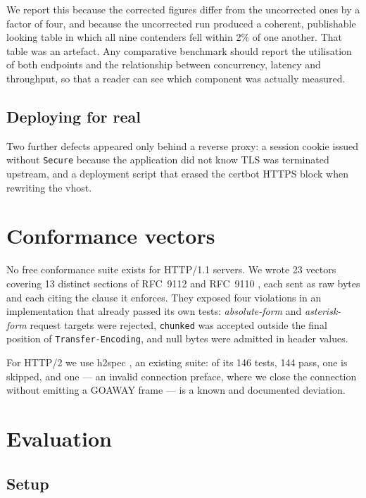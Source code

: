 \documentclass[preprint,12pt]{elsarticle}
\begin{document}
We report this because the corrected figures differ from the uncorrected ones by
a factor of four, and because the uncorrected run produced a coherent, publishable
looking table in which all nine contenders fell within 2\% of one another. That
table was an artefact. Any comparative benchmark should report the utilisation
of both endpoints and the relationship between concurrency, latency and
throughput, so that a reader can see which component was actually measured.

\subsection{Deploying for real}

Two further defects appeared only behind a reverse proxy: a session cookie
issued without \texttt{Secure} because the application did not know TLS was
terminated upstream, and a deployment script that erased the certbot HTTPS block
when rewriting the vhost.

\section{Conformance vectors}
\label{sec:conformance}

No free conformance suite exists for HTTP/1.1 servers. We wrote 23 vectors
covering 13 distinct sections of RFC~9112 \cite{rfc9112} and RFC~9110
\cite{rfc9110}, each sent as raw bytes
and each citing the clause it enforces. They exposed four violations in an
implementation that already passed its own tests: \emph{absolute-form} and
\emph{asterisk-form} request targets were rejected, \texttt{chunked} was
accepted outside the final position of \texttt{Transfer-Encoding}, and null
bytes were admitted in header values.

For HTTP/2 we use h2spec \cite{h2spec}, an existing suite: of its 146 tests, 144 pass, one is
skipped, and one --- an invalid connection preface, where we close the
connection without emitting a GOAWAY frame --- is a known and documented
deviation.

\section{Evaluation}
\label{sec:evaluation}

\subsection{Setup}
\end{document}
